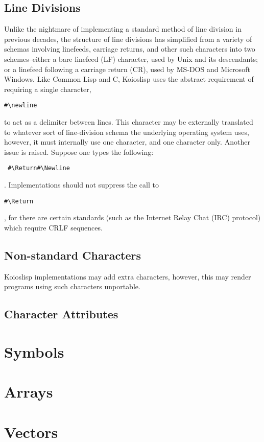 \documentclass[10pt]{book}
\begin{document}
\subsection{Line Divisions}
Unlike the nightmare of implementing a standard method of line division in previous decades, the structure of line divisions has simplified from a variety of schemas involving linefeeds, carriage returns, and other such characters into two schemes--either a bare linefeed (LF) character, used by {\sc Unix} and its descendants; or a linefeed following a carriage return (CR), used by MS-DOS and Microsoft Windows. Like Common Lisp and C, {\sc Koioslisp} uses the abstract requirement of requiring a single character, \begin{verbatim}#\newline\end{verbatim} to act as a delimiter between lines. This character may be externally translated to whatever sort of line-division schema the underlying operating system uses, however, it must internally use one character, and one character only. Another issue is raised. Suppose one types the following: \begin{verbatim} #\Return#\Newline\end{verbatim}. Implementations should not suppress the call to \begin{verbatim}#\Return\end{verbatim}, for there are certain standards (such as the Internet Relay Chat (IRC) protocol) which require CRLF sequences.  
\subsection{Non-standard Characters}
{\sc Koioslisp} implementations may add extra characters, however, this may render programs using such characters unportable.
\subsection{Character Attributes}

\section{Symbols}
\section{Arrays}

\section{Vectors}
\end{document}
